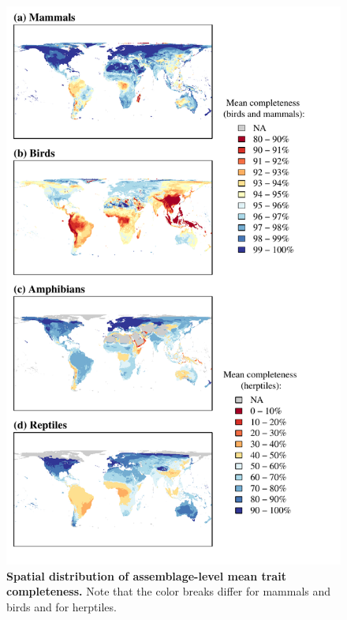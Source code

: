 \newpage
\begin{figure}[h!]
\vspace*{-2cm}
\centering
\includegraphics[scale=0.95]{Supporting/Chapter2/Figures/Maps/Mean_map_50k}
\caption[Spatial distribution of assemblage-level mean trait completeness in herptiles.]{\textbf{Spatial distribution of  assemblage-level mean trait completeness.} Note that the color breaks differ for mammals and birds and for herptiles.}
\label{}
\end{figure}

